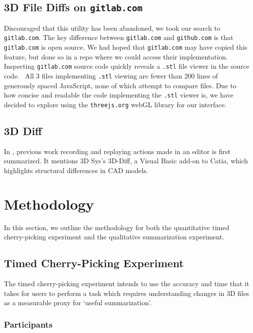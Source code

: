 \documentclass[sigconf,authorversion,nonacm]{acmart}
\begin{document}
\subsection{3D File Diffs on \texttt{gitlab.com}}

Discouraged that this utility has been abandoned, we took our search to \texttt{gitlab.com}.
The key difference between \texttt{gitlab.com} and \texttt{github.com} is that \texttt{gitlab.com} is open source.
We had hoped that \texttt{gitlab.com} may have copied this feature, but done so in a repo where we could access their implementation.
Inspecting \texttt{gitlab.com} source code quickly reveals a \texttt{.stl} file viewer in the source code.~\cite{gitlabsource}
All 3 files implementing \texttt{.stl} viewing are fewer than 200 lines of generously spaced JavaScript, none of which attempt to compare files.
Due to how concise and readable the code implementing the \texttt{.stl} viewer is, we have decided to explore using the \texttt{threejs.org} webGL library for our interface.

\subsection{3D Diff}

In \citet{Dobos}, previous work recording and replaying actions made in an editor is first summarized.
It mentions 3D Sys's 3D-Diff, a Visual Basic add-on to Catia, which highlights structural differences in CAD models.

\section{Methodology}

In this section, we outline the methodology for both the quantitative timed cherry-picking experiment and the qualitative summarization experiment.

\subsection{Timed Cherry-Picking Experiment}

The timed cherry-picking experiment intends to use the accuracy and time that it takes for users to perform a task which requires understanding changes in 3D files as a measurable proxy for `useful summarization'.

\subsubsection{Participants}
\end{document}
